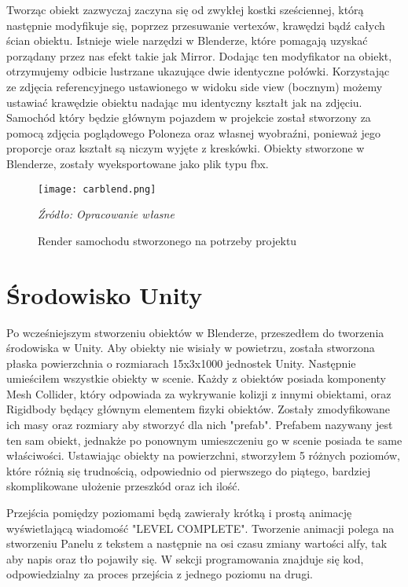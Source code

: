 \indent Tworząc obiekt zazwyczaj zaczyna się od zwykłej kostki sześciennej, którą następnie modyfikuje się, poprzez przesuwanie vertexów, krawędzi bądź całych ścian obiektu. Istnieje wiele narzędzi w Blenderze, które pomagają uzyskać porządany przez nas efekt takie jak Mirror. Dodając ten modyfikator na obiekt, otrzymujemy odbicie lustrzane ukazujące dwie identyczne połówki. Korzystając ze zdjęcia referencyjnego ustawionego w widoku side view (bocznym) możemy ustawiać krawędzie obiektu nadając mu identyczny kształt jak na zdjęciu. Samochód który będzie głównym pojazdem w projekcie został stworzony za pomocą zdjęcia poglądowego Poloneza oraz własnej wyobraźni, ponieważ jego proporcje oraz kształt są niczym wyjęte z kreskówki. Obiekty stworzone w Blenderze, zostały wyeksportowane jako plik typu fbx.

\begin{figure}[!h]
\centering
  \texttt{[image: carblend.png]}
  \caption{Render samochodu stworzonego na potrzeby projektu}\label{rys_2}
  \begin{minipage}[t]{0.5\linewidth}
    \emph{Źródło: Opracowanie własne}
  \end{minipage}
\end{figure}


\section{Środowisko Unity}
\indent Po wcześniejszym stworzeniu obiektów w Blenderze, przeszedłem do tworzenia środowiska w Unity. Aby obiekty nie wisiały w powietrzu, została stworzona płaska powierzchnia o rozmiarach 15x3x1000 jednostek Unity. Następnie umieściłem wszystkie obiekty w scenie. Każdy z obiektów posiada komponenty Mesh Collider, który odpowiada za wykrywanie kolizji z innymi obiektami, oraz Rigidbody będący głównym elementem fizyki obiektów.  Zostały zmodyfikowane ich masy oraz rozmiary aby stworzyć dla nich "prefab". Prefabem nazywany jest ten sam obiekt, jednakże po ponownym umieszczeniu go w scenie posiada te same właściwości. Ustawiając obiekty na powierzchni, stworzyłem 5 różnych poziomów, które różnią się trudnością, odpowiednio od pierwszego do piątego, bardziej skomplikowane ułożenie przeszkód oraz ich ilość. 

\indent Przejścia pomiędzy poziomami będą zawierały krótką i prostą animację wyświetlającą wiadomość "LEVEL COMPLETE". Tworzenie animacji polega na stworzeniu Panelu z tekstem a następnie na osi czasu zmiany wartości alfy, tak aby napis oraz tło pojawiły się. W sekcji programowania znajduje się kod, odpowiedzialny za proces przejścia z jednego poziomu na drugi. 

